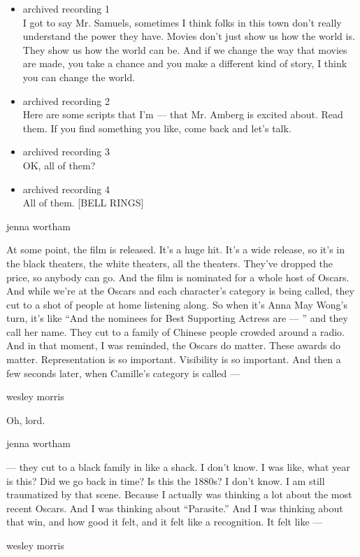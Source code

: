 \begin{itemize}
\item
  archived recording 1\\
  I got to say Mr. Samuels, sometimes I think folks in this town don't
  really understand the power they have. Movies don't just show us how
  the world is. They show us how the world can be. And if we change the
  way that movies are made, you take a chance and you make a different
  kind of story, I think you can change the world.
\item
  archived recording 2\\
  Here are some scripts that I'm --- that Mr. Amberg is excited about.
  Read them. If you find something you like, come back and let's talk.
\item
  archived recording 3\\
  OK, all of them?
\item
  archived recording 4\\
  All of them. {[}BELL RINGS{]}
\end{itemize}

jenna wortham

At some point, the film is released. It's a huge hit. It's a wide
release, so it's in the black theaters, the white theaters, all the
theaters. They've dropped the price, so anybody can go. And the film is
nominated for a whole host of Oscars. And while we're at the Oscars and
each character's category is being called, they cut to a shot of people
at home listening along. So when it's Anna May Wong's turn, it's like
``And the nominees for Best Supporting Actress are --- '' and they call
her name. They cut to a family of Chinese people crowded around a radio.
And in that moment, I was reminded, the Oscars do matter. These awards
do matter. Representation is so important. Visibility is so important.
And then a few seconds later, when Camille's category is called ---

wesley morris

Oh, lord.

jenna wortham

--- they cut to a black family in like a shack. I don't know. I was
like, what year is this? Did we go back in time? Is this the 1880s? I
don't know. I am still traumatized by that scene. Because I actually was
thinking a lot about the most recent Oscars. And I was thinking about
``Parasite.'' And I was thinking about that win, and how good it felt,
and it felt like a recognition. It felt like ---

wesley morris

